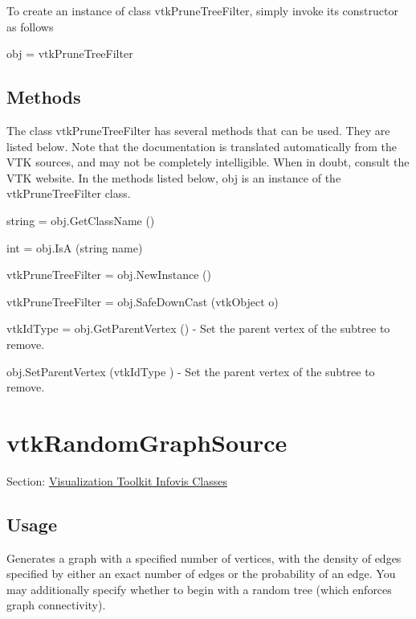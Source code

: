 To create an instance of class vtk\-Prune\-Tree\-Filter, simply invoke its constructor as follows \begin{DoxyVerb}  obj = vtkPruneTreeFilter
\end{DoxyVerb}
 \hypertarget{vtkwidgets_vtkxyplotwidget_Methods}{}\subsection{Methods}\label{vtkwidgets_vtkxyplotwidget_Methods}
The class vtk\-Prune\-Tree\-Filter has several methods that can be used. They are listed below. Note that the documentation is translated automatically from the V\-T\-K sources, and may not be completely intelligible. When in doubt, consult the V\-T\-K website. In the methods listed below, {\ttfamily obj} is an instance of the vtk\-Prune\-Tree\-Filter class. 
\begin{DoxyItemize}
\item {\ttfamily string = obj.\-Get\-Class\-Name ()}  
\item {\ttfamily int = obj.\-Is\-A (string name)}  
\item {\ttfamily vtk\-Prune\-Tree\-Filter = obj.\-New\-Instance ()}  
\item {\ttfamily vtk\-Prune\-Tree\-Filter = obj.\-Safe\-Down\-Cast (vtk\-Object o)}  
\item {\ttfamily vtk\-Id\-Type = obj.\-Get\-Parent\-Vertex ()} -\/ Set the parent vertex of the subtree to remove.  
\item {\ttfamily obj.\-Set\-Parent\-Vertex (vtk\-Id\-Type )} -\/ Set the parent vertex of the subtree to remove.  
\end{DoxyItemize}\hypertarget{vtkinfovis_vtkrandomgraphsource}{}\section{vtk\-Random\-Graph\-Source}\label{vtkinfovis_vtkrandomgraphsource}
Section\-: \hyperlink{sec_vtkinfovis}{Visualization Toolkit Infovis Classes} \hypertarget{vtkwidgets_vtkxyplotwidget_Usage}{}\subsection{Usage}\label{vtkwidgets_vtkxyplotwidget_Usage}
Generates a graph with a specified number of vertices, with the density of edges specified by either an exact number of edges or the probability of an edge. You may additionally specify whether to begin with a random tree (which enforces graph connectivity).

